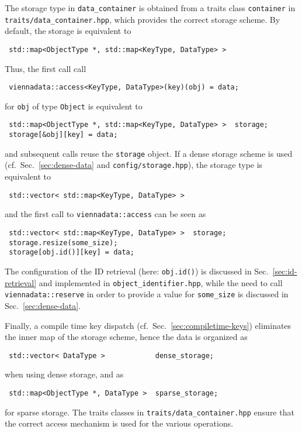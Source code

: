 The storage type in \lstinline|data_container| is obtained from a traits class \lstinline|container| in \lstinline|traits/data_container.hpp|, which provides the correct storage scheme.
By default, the storage is equivalent to
\begin{lstlisting}
 std::map<ObjectType *, std::map<KeyType, DataType> >
\end{lstlisting}
Thus, the first call call
\begin{lstlisting}
 viennadata::access<KeyType, DataType>(key)(obj) = data;
\end{lstlisting}
for \lstinline|obj| of type \lstinline|Object| is equivalent to
\begin{lstlisting}
 std::map<ObjectType *, std::map<KeyType, DataType> >  storage;
 storage[&obj][key] = data;
\end{lstlisting}
and subsequent calls reuse the \lstinline|storage| object. If a dense storage scheme is used (cf.~Sec.~\ref{sec:dense-data} and \lstinline|config/storage.hpp|), the storage type is equivalent to
\begin{lstlisting}
 std::vector< std::map<KeyType, DataType> >
\end{lstlisting}
and the first call to \lstinline|viennadata::access| can be seen as
\begin{lstlisting}
 std::vector< std::map<KeyType, DataType> >  storage;
 storage.resize(some_size);
 storage[obj.id()][key] = data;
\end{lstlisting}
The configuration of the ID retrieval (here: \lstinline|obj.id()|) is discussed in Sec.~\ref{sec:id-retrieval} and implemented in \lstinline|object_identifier.hpp|, while the need to call \lstinline|viennadata::reserve| in order to provide a value for \lstinline|some_size| is discussed in Sec.~\ref{sec:dense-data}.

Finally, a compile time key dispatch (cf.~Sec.~\ref{sec:compiletime-keys}) eliminates the inner map of the storage scheme, hence the data is organized as
\begin{lstlisting}
 std::vector< DataType >            dense_storage;
\end{lstlisting}
when using dense storage, and as
\begin{lstlisting}
 std::map<ObjectType *, DataType >  sparse_storage;
\end{lstlisting}
for sparse storage. The traits classes in \lstinline|traits/data_container.hpp| ensure that the correct access mechanism is used for the various operations.


